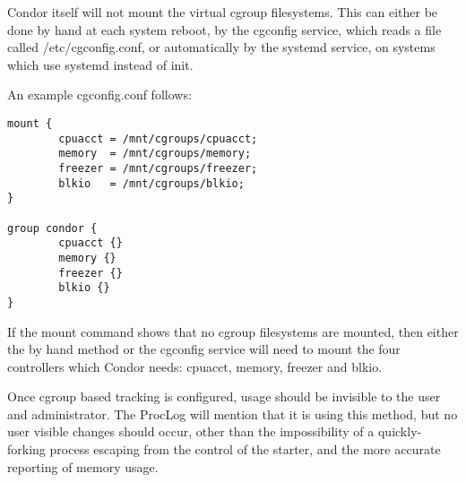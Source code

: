 Condor itself will not mount the virtual cgroup filesystems.  This can either be
done by hand at each system reboot, by the cgconfig service, which reads a file
called /etc/cgconfig.conf, or automatically by the systemd service, on systems
which use systemd instead of init.

An example cgconfig.conf follows:

\begin{verbatim}
mount {
        cpuacct = /mnt/cgroups/cpuacct;
        memory  = /mnt/cgroups/memory;
        freezer = /mnt/cgroups/freezer;
        blkio   = /mnt/cgroups/blkio;
}

group condor {
        cpuacct {}
        memory {}
        freezer {}
        blkio {}
}
\end{verbatim}

If the mount command shows that no cgroup filesystems are mounted, then either the
by hand method or the cgconfig service will need to mount the four controllers which
Condor needs:  cpuacct, memory, freezer and blkio.  

Once cgroup based tracking is configured, usage should be invisible to the user and administrator.  The ProcLog
will mention that it is using this method, but no user visible changes should occur,
other than the impossibility of a quickly-forking process escaping from the
control of the starter, and the more accurate reporting of memory usage.
